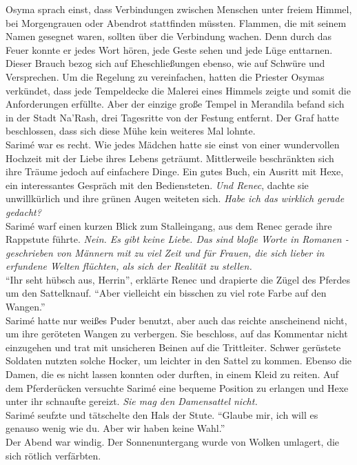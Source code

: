 Osyma sprach einst, dass Verbindungen zwischen Menschen unter freiem Himmel, bei Morgengrauen oder 
Abendrot stattfinden müssten. Flammen, die mit seinem Namen gesegnet waren, sollten über die 
Verbindung wachen. Denn durch das Feuer konnte er jedes Wort hören, jede Geste sehen und jede Lüge 
enttarnen. Dieser Brauch bezog sich auf Eheschließungen ebenso, wie auf Schwüre und Versprechen. Um 
die Regelung zu vereinfachen, hatten die Priester Osymas verkündet, dass jede Tempeldecke die 
Malerei eines Himmels zeigte und somit die Anforderungen erfüllte. Aber der einzige große Tempel in 
Merandila befand sich in der Stadt Na'Rash, drei Tagesritte von der Festung entfernt. Der Graf hatte 
beschlossen, dass sich diese Mühe kein weiteres Mal lohnte. \\
Sarimé war es recht. Wie jedes Mädchen hatte sie einst von einer wundervollen Hochzeit mit der 
Liebe ihres Lebens geträumt. Mittlerweile beschränkten sich ihre Träume jedoch auf einfachere 
Dinge. Ein gutes Buch, ein Ausritt mit Hexe, ein interessantes Gespräch mit den Bediensteten. 
\textit{Und Renec}, dachte sie unwillkürlich und ihre grünen Augen weiteten sich. \textit{Habe ich 
das wirklich gerade gedacht?}\\
Sarimé warf einen kurzen Blick zum Stalleingang, aus dem Renec gerade ihre Rappstute führte. 
\textit{Nein. Es gibt keine Liebe. Das sind bloße Worte in Romanen - geschrieben von Männern mit zu 
viel Zeit und für Frauen, die sich lieber in erfundene Welten flüchten, als sich der Realität zu 
stellen.}\\
``Ihr seht hübsch aus, Herrin'', erklärte Renec und drapierte die Zügel des Pferdes um den 
Sattelknauf. ``Aber vielleicht ein bisschen zu viel rote Farbe auf den Wangen.''\\
Sarimé hatte nur weißes Puder benutzt, aber auch das reichte anscheinend nicht, um ihre geröteten 
Wangen zu verbergen. Sie beschloss, auf das Kommentar nicht einzugehen und trat mit unsicheren 
Beinen auf die Trittleiter. Schwer gerüstete Soldaten nutzten solche Hocker, um leichter in den 
Sattel zu kommen. Ebenso die Damen, die es nicht lassen konnten oder durften, in einem Kleid zu 
reiten. Auf dem Pferderücken versuchte Sarimé eine bequeme Position zu erlangen und Hexe unter ihr 
schnaufte gereizt. \textit{Sie mag den Damensattel nicht.}\\
Sarimé seufzte und tätschelte den Hals der Stute. ``Glaube mir, ich will es genauso wenig wie du. 
Aber wir haben keine Wahl.''\\
Der Abend war windig. Der Sonnenuntergang wurde von Wolken umlagert, die sich rötlich verfärbten. 
